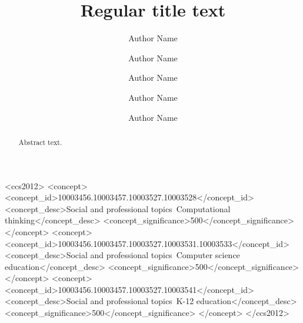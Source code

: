 \documentclass[sigconf]{acmart}
\begin{document}
%
\title[Title for top of each page]{Regular title text}

\author{Author Name}

\author{Author Name}

\author{Author Name}

\author{Author Name}

\author{Author Name}
%
\renewcommand{\shortauthors}{Authors, et al.}

%
\begin{abstract}
Abstract text. 
\end{abstract}

\begin{CCSXML}
<ccs2012>
<concept>
<concept_id>10003456.10003457.10003527.10003528</concept_id>
<concept_desc>Social and professional topics~Computational thinking</concept_desc>
<concept_significance>500</concept_significance>
</concept>
<concept>
<concept_id>10003456.10003457.10003527.10003531.10003533</concept_id>
<concept_desc>Social and professional topics~Computer science education</concept_desc>
<concept_significance>500</concept_significance>
</concept>
<concept>
<concept_id>10003456.10003457.10003527.10003541</concept_id>
<concept_desc>Social and professional topics~K-12 education</concept_desc>
<concept_significance>500</concept_significance>
</concept>
</ccs2012>
\end{CCSXML}
\end{document}
